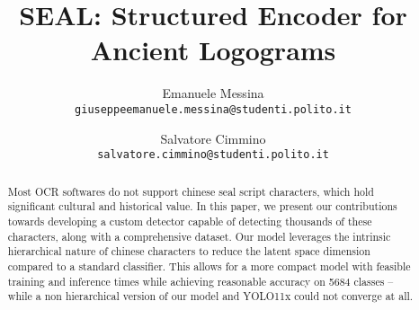 \documentclass[10pt,twocolumn,letterpaper]{article}
\begin{document}
\title{SEAL: Structured Encoder for Ancient Logograms}

\author{Emanuele Messina\\
{\tt\small giuseppeemanuele.messina@studenti.polito.it}
\and
Salvatore Cimmino\\
{\tt\small salvatore.cimmino@studenti.polito.it}
}

\maketitle

\begin{abstract}
	Most OCR softwares do not support chinese seal script characters, which hold significant cultural and historical value. In this paper, we present our contributions towards developing a custom detector capable of detecting thousands of these characters, along with a comprehensive dataset. Our model leverages the intrinsic hierarchical nature of chinese characters to reduce the latent space dimension compared to a standard classifier. This allows for a more compact model with feasible training and inference times while achieving reasonable accuracy on 5684 classes -- while a non hierarchical version of our model and YOLO11x could not converge at all.
\end{abstract}








{\small
	
	
}
\end{document}
